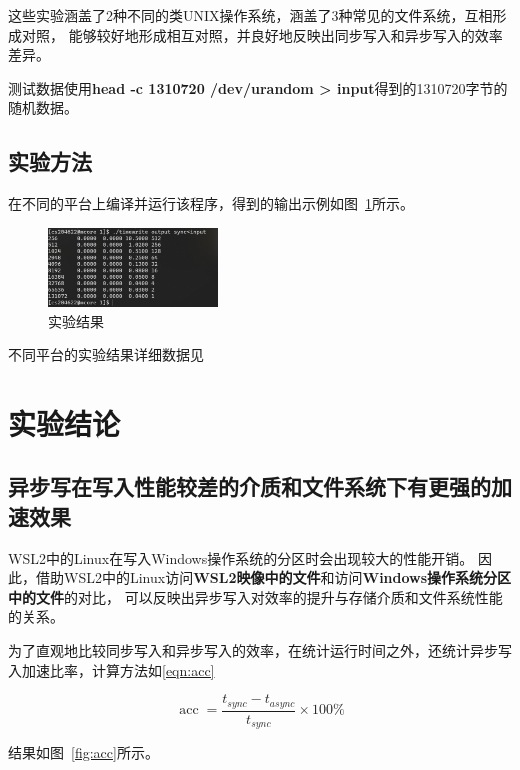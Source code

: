 \documentclass[a4paper,twoside]{article}
\begin{document}
\begin{spacing}{1.2}
这些实验涵盖了2种不同的类UNIX操作系统，涵盖了3种常见的文件系统，互相形成对照，
能够较好地形成相互对照，并良好地反映出同步写入和异步写入的效率差异。

测试数据使用\textbf{head -c 1310720 /dev/urandom > input}得到的1310720字节的
随机数据。

\subsection{实验方法}

在不同的平台上编译并运行该程序，得到的输出示例如图~\ref{fig:output}所示。

\begin{figure}[htbp]
	\centering
	\caption{实验结果}
	\label{fig:output}
	\includegraphics[width=0.4\textwidth]{output.png}
\end{figure}

不同平台的实验结果详细数据见

\section{实验结论}

\subsection{异步写在写入性能较差的介质和文件系统下有更强的加速效果}

WSL2中的Linux在写入Windows操作系统的分区时会出现较大的性能开销\cite{githubwsl2Filesystem}。
因此，借助WSL2中的Linux访问\textbf{WSL2映像中的文件}和访问\textbf{Windows操作系统分区中的文件}的对比，
可以反映出异步写入对效率的提升与存储介质和文件系统性能的关系。

为了直观地比较同步写入和异步写入的效率，在统计运行时间之外，还统计异步写入加速比率，计算方法如\eqref{eqn:acc}

\begin{equation}
	\label{eqn:acc}
	\mathop{\mathrm{acc}}=\frac{t_{sync}-t_{async}}{t_{sync}} \times 100\%
\end{equation}

结果如图~\ref{fig:acc}所示。


\end{spacing}
\end{document}
